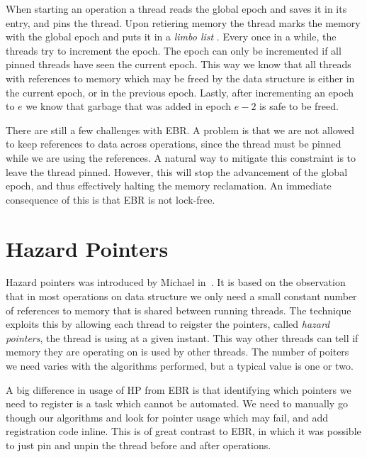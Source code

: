 \documentclass[b5paper,twoside]{report}
\begin{document}
When starting an operation a thread reads the global epoch and saves it
in its entry, and pins the thread.
Upon retiering memory the thread marks the memory with the global epoch
and puts it in a \emph{limbo list} .
Every once in a while, the threads try to increment the epoch.
The epoch can only be incremented if all pinned threads
have seen the current epoch. This way we know that all threads
with references to memory which may be freed by the data structure
is either in the current epoch, or in the previous epoch.
Lastly, after incrementing an epoch to $e$ we know that garbage that
was added in epoch $e-2$ is safe to be freed.


There are still a few challenges with EBR.
A problem is that we are not allowed to keep references to data across operations,
since the thread must be pinned while we are using the references.
A natural way to mitigate this constraint is to leave the thread pinned.
However, this will stop the advancement of the global epoch, and thus effectively
halting the memory reclamation.
An immediate consequence of this is that EBR is not lock-free.



\section{Hazard Pointers}

Hazard pointers was introduced by Michael in~\cite{michael2004hazard}.
It is based on the observation that in most operations on data structure
we only need a small constant number of references to memory that is shared
between running threads. The technique exploits this by allowing each
thread to reigster the pointers, called \emph{hazard pointers},
the thread is using at a given instant. This way other threads can tell
if memory they are operating on is used by other threads.
The number of poiters we need varies with the algorithms performed,
but a typical value is one or two.

A big difference in usage of HP from EBR is that identifying which
pointers we need to register is a task which cannot be automated.
We need to manually go though our algorithms and look for pointer
usage which may fail, and add registration code inline.
This is of great contrast to EBR, in which it was possible to
just pin and unpin the thread before and after operations.
\end{document}
